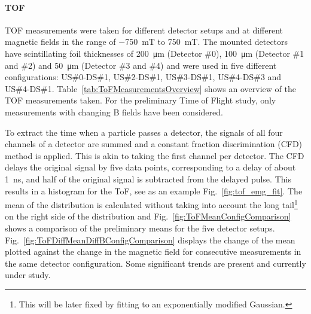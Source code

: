 \begin{refsection}
        \paragraph{TOF}
        TOF measurements were taken for different detector setups and at different magnetic fields in the range of \SI{-750}{mT} to \SI{+750}{mT}. 
        The mounted detectors have scintillating foil thicknesses of \SI{200}{\micro\meter} (Detector \#0), \SI{100}{\micro\meter} (Detector \#1 and \#2) and \SI{50}{\micro\meter} (Detector \#3 and \#4) and were used in five different configurations: US\#0-DS\#1, US\#2-DS\#1, US\#3-DS\#1, US\#4-DS\#3 and US\#4-DS\#1. Table~\ref{tab:ToFMeasurementsOverview} shows an overview of the TOF measurements taken. 
        For the preliminary Time of Flight study, only measurements with changing B fields have been considered.

        \noindent
        To extract the time when a particle passes a detector, the signals of all four channels of a detector are summed and a constant fraction discrimination (CFD) method is applied. 
        This is akin to taking the first channel per detector.
        The CFD delays the original signal by five data points, corresponding to a delay of about \SI{1}{ns}, and half of the original signal is subtracted from the delayed pulse. 
        This results in a histogram for the ToF, see as an example Fig.~\ref{fig:tof_emg_fit}.
        The mean of the distribution is calculated without taking into account the long tail\footnote{This will be later fixed by fitting to an exponentially modified Gaussian.} on the right side of the distribution and Fig.~\ref{fig:ToFMeanConfigComparison} shows a comparison of the preliminary means for the five detector setups.
        Fig.~\ref{fig:ToFDiffMeanDiffBConfigComparison} displays the change of the mean plotted against the change in the magnetic field for consecutive measurements in the same detector configuration. 
        Some significant trends are present and currently under study. 


\end{refsection}
